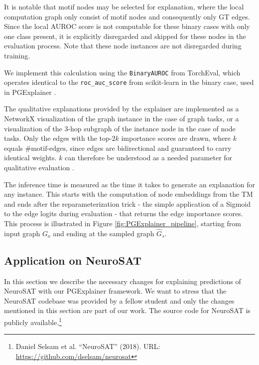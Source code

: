 It is notable that motif nodes may be selected for explanation, where the local computation graph only consist of motif nodes and consequently only \ac{GT} edges. Since the local AUROC score is not computable for these binary cases with only one class present, it is explicitly disregarded and skipped for these nodes in the evaluation process. Note that these node instances are not disregarded during training.

We implement this calculation using the \lstinline|BinaryAUROC| from TorchEval, which operates identical to the \lstinline|roc_auc_score| from scikit-learn \cite{pedregosa2011scikit} in the binary case, used in PGExplainer \cite{luo2020parameterized}.

The qualitative explanations provided by the explainer are implemented as a NetworkX visualization of the graph instance in the case of graph tasks, or a visualization of the $3$-hop subgraph of the instance node in the case of node tasks. Only the edges with the top-$2k$ importance scores are drawn, where $k$ equals $\text{\#motif-edges}$, since edges are bidirectional and guaranteed to carry identical weights. $k$ can therefore be understood as a needed parameter for qualitative evaluation \cite{holdijk2021re}. \bigskip

The inference time is measured as the time it takes to generate an explanation for any instance. This starts with the computation of node embeddings from the \ac{TM} and ends after the reparameterization trick - the simple application of a Sigmoid to the edge logits during evaluation - that returns the edge importance scores. This process is illustrated in Figure \ref{fig:PGExplainer_pipeline}, starting from input graph $G_o$ and ending at the sampled graph $\hat{G}_s$. \bigskip

\subsection{Application on NeuroSAT}
\label{sec:Application_to_NeuroSAT}

In this section we describe the necessary changes for explaining predictions of NeuroSAT \cite{selsam2018learning} with our PGExplainer framework. We want to stress that the NeuroSAT codebase was provided by a fellow student and only the changes mentioned in this section are part of our work. The source code for NeuroSAT is publicly available.\footnote{Daniel Selsam et al. “NeuroSAT” (2018). URL: \url{https://github.com/dselsam/neurosat}} \bigskip

